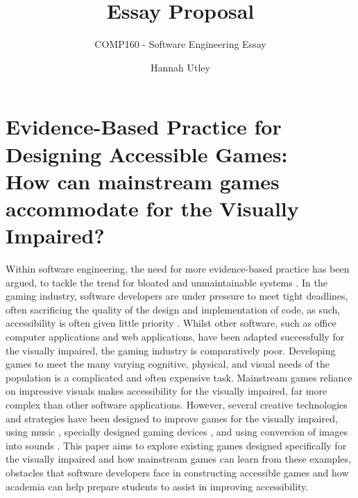 \documentclass{scrartcl}
\title{Essay Proposal}
\subtitle{COMP160 - Software Engineering Essay}
\author{Hannah Utley}
\begin{document}
\maketitle

\section*{Evidence-Based Practice for Designing Accessible Games:\\
 How can mainstream games accommodate for the Visually Impaired?}

Within software engineering, the need for more evidence-based practice has been argued, to tackle the trend for bloated and unmaintainable systems \cite{softwaredevelopers}. In the gaming industry, software developers are under pressure to meet tight deadlines, often sacrificing the quality of the design and implementation of code, as such, accessibility is often given little priority \cite{D.McPheron}. Whilst other software, such as office computer applications and web applications, have been adapted successfully for the visually impaired, the gaming industry is comparatively poor.  Developing games to meet the many varying cognitive, physical, and visual needs of the population is a complicated and often expensive task. Mainstream games reliance on impressive visuals makes accessibility for the visually impaired, far more complex than other software applications. However, several creative technologies and strategies have been designed to improve games for the visually impaired, using music \cite{Lotto}, specially designed gaming devices \cite{Ohtsuka}, and using conversion of images into sounds \cite{Marshall}. This paper aims to explore existing games designed specifically for the visually impaired and how mainstream games can learn from these examples, obstacles that software developers face in constructing accessible games and how academia can help prepare students to assist in improving accessibility.
\end{document}
